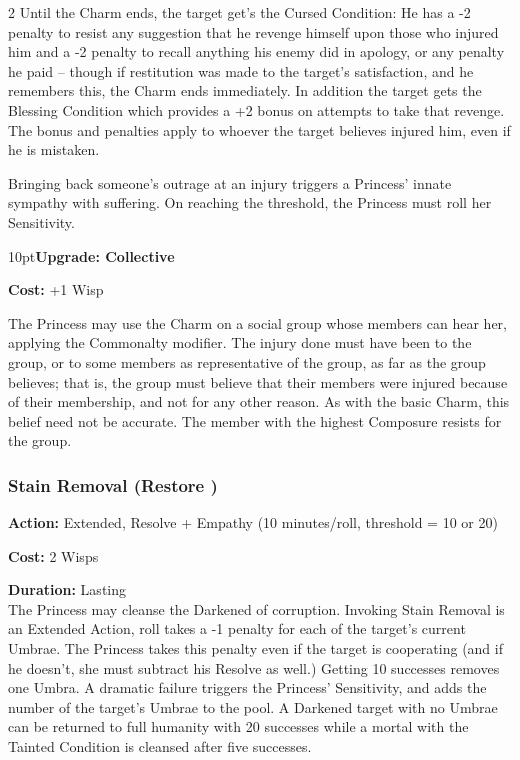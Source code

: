 \begin{multicols}{2}
Until the Charm ends, the target get's the Cursed Condition: He has a -2 penalty to resist any suggestion that he revenge himself upon those who injured him and a -2 penalty to recall anything his enemy did in apology, or any penalty he paid -- though if restitution was made to the target's satisfaction, and he remembers this, the Charm ends immediately. In addition the target gets the Blessing Condition which provides a +2 bonus on attempts to take that revenge. The bonus and penalties apply to whoever the target believes injured him, even if he is mistaken.

Bringing back someone's outrage at an injury triggers a Princess' innate sympathy with suffering. On reaching the threshold, the Princess must roll her Sensitivity.
\begin{myindentpar}{10pt}\textbf{Upgrade: Collective}

\noindent \textbf{Cost:} +1 Wisp

The Princess may use the Charm on a social group whose members can hear her, applying the Commonalty modifier. The injury done must have been to the group, or to some members as representative of the group, as far as the group believes; that is, the group must believe that their members were injured because of their membership, and not for any other reason. As with the basic Charm, this belief need not be accurate. The member with the highest Composure resists for the group.\end{myindentpar}


\subsubsection*{Stain Removal (Restore \textbullet\textbullet\textbullet)}

\noindent \textbf{Action:} Extended, Resolve + Empathy (10 minutes/roll, threshold = 10 or 20)

\noindent \textbf{Cost:} 2 Wisps

\noindent \textbf{Duration:} Lasting \\

\noindent The Princess may cleanse the Darkened of corruption. Invoking Stain Removal is an Extended Action, roll takes a -1 penalty for each of the target's current Umbrae. The Princess takes this penalty even if the target is cooperating (and if he doesn't, she must subtract his Resolve as well.) Getting 10 successes removes one Umbra. A dramatic failure triggers the Princess' Sensitivity, and adds the number of the target's Umbrae to the pool. A Darkened target with no Umbrae can be returned to full humanity with 20 successes while a mortal with the Tainted Condition is cleansed after five successes.


\end{multicols}
